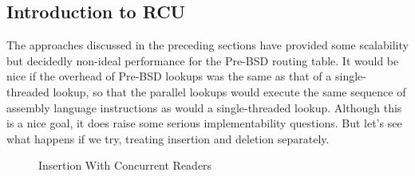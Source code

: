 
\subsection{Introduction to RCU}
\label{sec:defer:Introduction to RCU}

The approaches discussed in the preceding sections have provided
some scalability but decidedly non-ideal performance for the
Pre-BSD routing table.
It would be nice if the overhead of Pre-BSD lookups was the same as
that of a single-threaded lookup, so that the parallel lookups would
execute the same sequence of assembly language instructions as would a
single-threaded lookup.
Although this is a nice goal, it does raise some serious implementability
questions.
But let's see what happens if we try, treating insertion and deletion
separately.

\begin{figure}[tb]
\centering
{}
\caption{Insertion With Concurrent Readers}
\label{fig:defer:Insertion With Concurrent Readers}
\end{figure}

